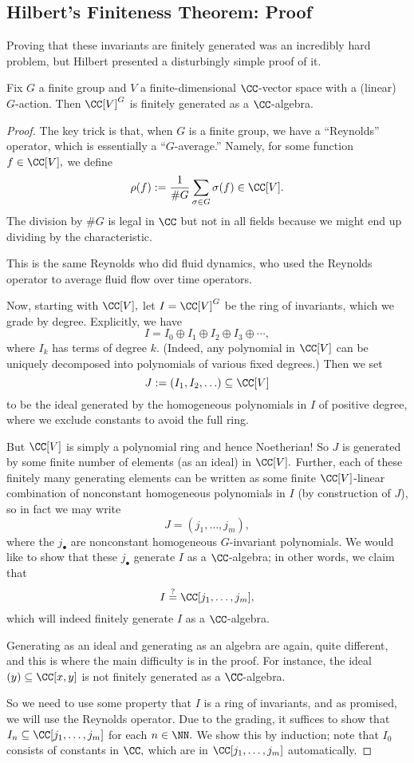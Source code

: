 \subsection{Hilbert's Finiteness Theorem: Proof}
Proving that these invariants are finitely generated was an incredibly hard problem, but Hilbert presented a disturbingly simple proof of it.
\begin{theorem}
	Fix $G$ a finite group and $V$ a finite-dimensional $\CC$-vector space with a (linear) $G$-action. Then $\CC[V]^G$ is finitely generated as a $\CC$-algebra.
\end{theorem}
\begin{proof}
	The key trick is that, when $G$ is a finite group, we have a ``Reynolds'' operator, which is essentially a ``$G$-average.'' Namely, for some function $f\in\CC[V],$ we define
	\[\rho(f):=\frac1{\#G}\sum_{\sigma\in G}\sigma(f)\in\CC[V].\]
	The division by $\#G$ is legal in $\CC$ but not in all fields because we might end up dividing by the characteristic.
	\begin{remark}
		This is the same Reynolds who did fluid dynamics, who used the Reynolds operator to average fluid flow over time operators.
	\end{remark}
	Now, starting with $\CC[V],$ let $I=\CC[V]^G$ be the ring of invariants, which we grade by degree. Explicitly, we have
	\[I=I_0\oplus I_1\oplus I_2\oplus I_3\oplus\cdots,\]
	where $I_k$ has terms of degree $k.$ (Indeed, any polynomial in $\CC[V]$ can be uniquely decomposed into polynomials of various fixed degrees.) Then we set
	\[J:=(I_1,I_2,\ldots)\subseteq\CC[V]\]
	to be the ideal generated by the homogeneous polynomials in $I$ of positive degree, where we exclude constants to avoid the full ring.

	But $\CC[V]$ is simply a polynomial ring and hence Noetherian! So $J$ is generated by some finite number of elements (as an ideal) in $\CC[V].$ Further, each of these finitely many generating elements can be written as some finite $\CC[V]$-linear combination of nonconstant homogeneous polynomials in $I$ (by construction of $J$), so in fact we may write
	\[J=(j_1,\ldots,j_m),\]
	where the $j_\bullet$ are nonconstant homogeneous $G$-invariant polynomials. We would like to show that these $j_\bullet$ generate $I$ as a $\CC$-algebra; in other words, we claim that
	\[I\stackrel?=\CC[j_1,\ldots,j_m],\]
	which will indeed finitely generate $I$ as a $\CC$-algebra.
	\begin{remark}
		Generating as an ideal and generating as an algebra are again, quite different, and this is where the main difficulty is in the proof. For instance, the ideal $(y)\subseteq\CC[x,y]$ is not finitely generated as a $\CC$-algebra.
	\end{remark}
	So we need to use some property that $I$ is a ring of invariants, and as promised, we will use the Reynolds operator. Due to the grading, it suffices to show that $I_n\subseteq\CC[j_1,\ldots,j_m]$ for each $n\in\NN.$ We show this by induction; note that $I_0$ consists of constants in $\CC,$ which are in $\CC[j_1,\ldots,j_m]$ automatically.
	

\end{proof}
